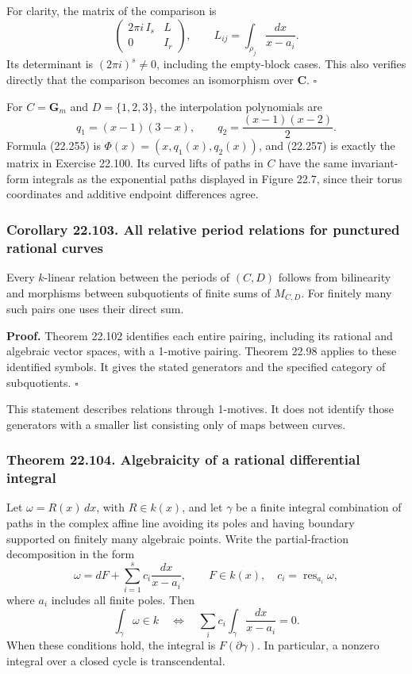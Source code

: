 \documentclass[
  11pt,
  a4paper,
]{article}
\begin{document}
For clarity, the matrix of the comparison is \[
 \begin{pmatrix}
    2\pi i\,I_s & L\\
    0&I_r
 \end{pmatrix},
 \qquad
 L_{ij}=\int_{\rho_j}\frac{dx}{x-a_i}.
 \tag{22.257}
\] Its determinant is \((2\pi i)^s\ne0\), including the empty-block
cases. This also verifies directly that the comparison becomes an
isomorphism over \(\mathbf C\). \(\square\)

For \(C=\mathbf G_m\) and \(D=\{1,2,3\}\), the interpolation polynomials
are \[
 q_1=(x-1)(3-x),\qquad q_2=\frac{(x-1)(x-2)}2.
\] Formula (22.255) is \(\Phi(x)=(x,q_1(x),q_2(x))\), and (22.257) is
exactly the matrix in Exercise 22.100. Its curved lifts of paths in
\(C\) have the same invariant-form integrals as the exponential paths
displayed in Figure 22.7, since their torus coordinates and additive
endpoint differences agree.

\subsubsection{Corollary 22.103. All relative period relations for
punctured rational
curves}\label{corollary-22.103.-all-relative-period-relations-for-punctured-rational-curves}

Every \(k\)-linear relation between the periods of \((C,D)\) follows
from bilinearity and morphisms between subquotients of finite sums of
\(M_{C,D}\). For finitely many such pairs one uses their direct sum.

\textbf{Proof.} Theorem 22.102 identifies each entire pairing, including
its rational and algebraic vector spaces, with a 1-motive pairing.
Theorem 22.98 applies to these identified symbols. It gives the stated
generators and the specified category of subquotients. \(\square\)

This statement describes relations through 1-motives. It does not
identify those generators with a smaller list consisting only of maps
between curves.

\subsubsection{Theorem 22.104. Algebraicity of a rational differential
integral}\label{theorem-22.104.-algebraicity-of-a-rational-differential-integral}

Let \(\omega=R(x)\,dx\), with \(R\in k(x)\), and let \(\gamma\) be a
finite integral combination of paths in the complex affine line avoiding
its poles and having boundary supported on finitely many algebraic
points. Write the partial-fraction decomposition in the form \[
 \omega=dF+\sum_{i=1}^s c_i\frac{dx}{x-a_i},
 \qquad
 F\in k(x),\quad c_i=\operatorname{res}_{a_i}\omega,
 \tag{22.258}
\] where \(a_i\) includes all finite poles. Then \[
 \int_\gamma\omega\in k
 \quad\Longleftrightarrow\quad
 \sum_i c_i\int_\gamma\frac{dx}{x-a_i}=0.
 \tag{22.259}
\] When these conditions hold, the integral is \(F(\partial\gamma)\). In
particular, a nonzero integral over a closed cycle is transcendental.
\end{document}
